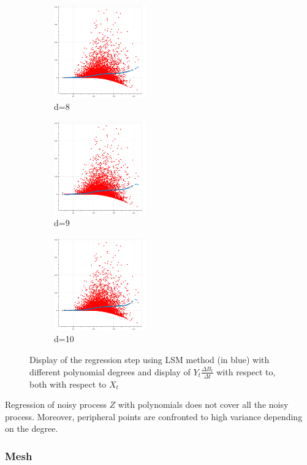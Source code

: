 \documentclass[english,11pt,openany]{report}
\theoremstyle{definition}
\theoremstyle{plain}
\theoremstyle{definition}
\begin{document}
\begin{figure}[H]
	\begin{subfigure}[t]{0.3\textwidth}
		\includegraphics[width=40mm]{lsm/l=8.png}
		\caption{d=8}
		\label{fig:d}
	\end{subfigure}
	\begin{subfigure}[t]{0.3\textwidth}
		\includegraphics[width=40mm]{lsm/l=9.png}
		\caption{d=9}
		\label{fig:c}
	\end{subfigure}	
	\begin{subfigure}[t]{0.3\textwidth}
		\includegraphics[width=40mm]{lsm/l=10.png}
		\caption{d=10}
		\label{fig:d}
	\end{subfigure}

	\caption{Display of the regression step using LSM method (in blue) with different polynomial degrees and display of $Y_{t}\frac{\Delta B_t}{\Delta t}$ with respect to, both with respect to $X_t$ \label{figure:poly}}
\end{figure}

Regression of noisy process $Z$ with polynomials does not cover all the noisy process. Moreover, peripheral points are confronted to high variance depending on the degree.


 \subsubsection{Mesh}
\end{document}
